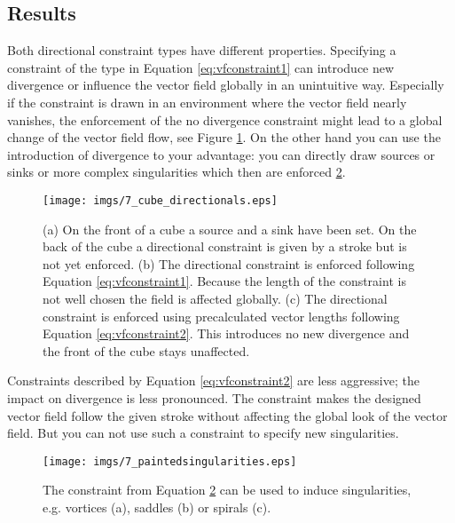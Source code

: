 \subsection{Results}

Both directional constraint types have different properties. Specifying a constraint of the type in Equation \ref{eq:vfconstraint1} can introduce new divergence or influence the vector field globally in an unintuitive way. Especially if the constraint is drawn in an environment where the vector field nearly vanishes, the enforcement of the no divergence constraint might lead to a global change of the vector field flow, see Figure \ref{fig:vf_dirconstr}. On the other hand you can use the introduction of divergence to your advantage: you can directly draw sources or sinks or more complex singularities which then are enforced \ref{fig:7_paintedSing}.

\begin{figure}%
\begin{center}
\texttt{[image: imgs/7\_cube\_directionals.eps]}%
\end{center}
\vspace{-15pt}
\caption{(a) On the front of a cube a source and a sink have been set. On the back of the cube a directional constraint is given by a stroke but is not yet enforced. (b) The directional constraint is enforced following Equation \ref{eq:vfconstraint1}. Because the length of the constraint is not well chosen the field is affected globally.
(c) The directional constraint is enforced using precalculated vector lengths following Equation \ref{eq:vfconstraint2}. This introduces no new divergence and the front of the cube stays unaffected. }%
\label{fig:vf_dirconstr}%
\end{figure}


Constraints described by Equation \ref{eq:vfconstraint2} are less aggressive; the impact on divergence is less pronounced. The constraint makes the designed vector field  follow the given stroke without affecting the global look of the vector field. But you can not use such a constraint to specify new singularities.

\begin{figure}%
\texttt{[image: imgs/7\_paintedsingularities.eps]}%
\caption{The constraint from Equation \ref{fig:7_paintedSing} can be used to induce singularities, e.g. vortices (a), saddles (b) or spirals (c).}%
\label{fig:7_paintedSing}%
\end{figure}

